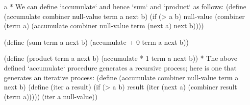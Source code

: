 \begitems\style a
* We can define `accumulate` and hence `sum` and `product` as follows:
\begtt\scm
(define (accumulate combiner null-value term a next b)
  (if (> a b)
      null-value
      (combiner (term a)
                (accumulate combiner null-value term (next a) next b))))

(define (sum term a next b)
  (accumulate + 0 term a next b))

(define (product term a next b)
  (accumulate * 1 term a next b))
\endtt
* The above defined `accumulate` procedure generates a recursive process;  here is one that generates an iterative process:
\begtt\scm
(define (accumulate combiner null-value term a next b)
  (define (iter a result)
    (if (> a b)
        result
        (iter (next a) (combiner result (term a)))))
  (iter a null-value))
\endtt
\enditems
